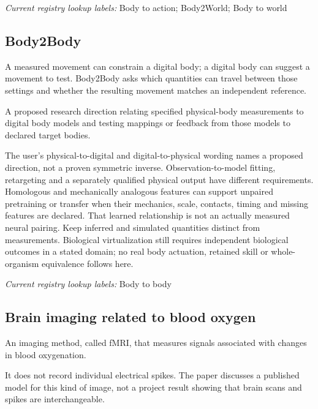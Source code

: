 \noindent\textit{Current registry lookup labels:} Body to action; Body2World; Body to world\par

\subsection*{Body2Body}
\noindent A measured movement can constrain a digital body; a digital body can suggest a movement to test. Body2Body asks which quantities can travel between those settings and whether the resulting movement matches an independent reference.\par
\noindent A proposed research direction relating specified physical-body measurements to digital body models and testing mappings or feedback from those models to declared target bodies.\par
\begin{samepage}
\noindent The user’s physical-to-digital and digital-to-physical wording names a proposed direction, not a proven symmetric inverse. Observation-to-model fitting, retargeting and a separately qualified physical output have different requirements. Homologous and mechanically analogous features can support unpaired pretraining or transfer when their mechanics, scale, contacts, timing and missing features are declared. That learned relationship is not an actually measured neural pairing. Keep inferred and simulated quantities distinct from measurements. Biological virtualization still requires independent biological outcomes in a stated domain; no real body actuation, retained skill or whole-organism equivalence follows here.\par\nopagebreak[4]

\end{samepage}


\noindent\textit{Current registry lookup labels:} Body to body\par

\begin{samepage}
\subsection*{Brain imaging related to blood oxygen}
\noindent An imaging method, called fMRI, that measures signals associated with changes in blood oxygenation.\par
\end{samepage}
\begin{samepage}
\noindent It does not record individual electrical spikes. The paper discusses a published model for this kind of image, not a project result showing that brain scans and spikes are interchangeable.\par\nopagebreak[4]

\end{samepage}


